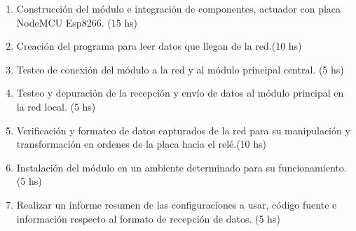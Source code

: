 \documentclass[11pt]{charter}
\begin{document}
\begin{enumerate}
	\begin{enumerate}
	\item Construcción del módulo e integración de componentes, actuador con placa NodeMCU Esp8266. (15 hs)
	\item Creación del programa para leer datos que llegan de la red.(10 hs)
	\item Testeo de conexión del módulo a la red y al módulo principal central. (5 hs)
	\item Testeo y depuración de la recepción y envío de datos al módulo principal en la red local. (5 hs)
	\item Verificación y formateo de datos capturados de la red para su manipulación y transformación en ordenes de la placa hacia el relé.(10 hs)
	\item Instalación del módulo en un ambiente determinado para su funcionamiento. (5 hs)
	\item Realizar un informe resumen de las configuraciones a usar, código fuente e información respecto al formato de recepción de datos. (5 hs)
	\end{enumerate}
	

\end{enumerate}
\end{document}
